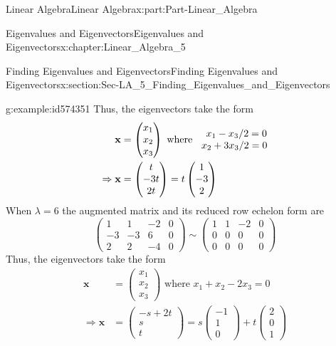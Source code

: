 \documentclass[oneside,10pt,]{book}
\numberwithin{equation}{section}
\newcommand{\amp}{&}
\begin{document}
\begin{partptx}{Linear Algebra}{}{Linear Algebra}{}{}{x:part:Part-Linear_Algebra}
\begin{chapterptx}{Eigenvalues and Eigenvectors}{}{Eigenvalues and Eigenvectors}{}{}{x:chapter:Linear_Algebra_5}
\begin{sectionptx}{Finding Eigenvalues and Eigenvectors}{}{Finding Eigenvalues and Eigenvectors}{}{}{x:section:Sec-LA_5_Finding_Eigenvalues_and_Eigenvectors}
\begin{example}{}{g:example:id574351}
Thus, the eigenvectors take the form%
\begin{align*}
\mathbf{x} \amp =\begin{pmatrix} x_1 \\ x_2 \\ x_3 \end{pmatrix} \textrm{ where } \begin{matrix} \hspace{3.5mm} x_1-x_3/2=0 \\ \hspace{2mm} x_2+3x_3/2=0 \end{matrix} \\
\Rightarrow \mathbf{x} \amp =\begin{pmatrix} t \\ -3t \\ 2t \end{pmatrix} = t\begin{pmatrix} 1 \\ -3 \\ 2 \end{pmatrix}
\end{align*}
When \(\lambda=6\) the augmented matrix and its reduced row echelon form are%
\begin{equation*}
\begin{pmatrix} 1 \amp 1 \amp -2 \amp 0 \\ -3 \amp -3 \amp 6 \amp 0 \\ 2 \amp 2 \amp -4 \amp 0 \end{pmatrix} \sim \begin{pmatrix} 1 \amp 1 \amp -2 \amp 0 \\ 0 \amp 0 \amp 0 \amp 0 \\ 0 \amp 0 \amp 0 \amp 0 \end{pmatrix} 
\end{equation*}
Thus, the eigenvectors take the form%
\begin{align*}
\mathbf{x} \amp =\begin{pmatrix} x_1 \\ x_2 \\ x_3 \end{pmatrix} \textrm{ where } x_1+x_2-2x_3=0 \\
\Rightarrow \mathbf{x} \amp =\begin{pmatrix} -s+2t \\ s \\ t \end{pmatrix} = s\begin{pmatrix} -1 \\ 1 \\ 0 \end{pmatrix}+t\begin{pmatrix} 2 \\ 0 \\ 1 \end{pmatrix}

\end{align*}
\end{example}
\end{sectionptx}
\end{chapterptx}
\end{partptx}
\end{document}
